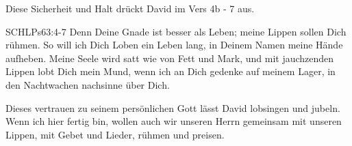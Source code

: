 \documentclass[14pt]{mybib}
\begin{document}
    \begin{otsblock}
        Diese Sicherheit und Halt drückt David im Vers 4b - 7 aus.
        \begin{bibelbox}{SCHL}{Ps}{63:4-7}
            Denn Deine Gnade ist besser als Leben; meine Lippen sollen Dich rühmen. So will ich Dich Loben ein Leben lang, in Deinem Namen meine Hände aufheben. Meine Seele wird satt wie von Fett und Mark, und mit jauchzenden Lippen lobt Dich mein Mund, wenn ich an Dich gedenke auf meinem Lager, in den Nachtwachen nachsinne über Dich.
        \end{bibelbox}
        Dieses vertrauen zu seinem persönlichen Gott lässt David lobsingen und jubeln.
        Wenn ich hier fertig bin, wollen auch wir unseren Herrn gemeinsam mit unseren Lippen, mit Gebet und Lieder, rühmen und preisen.
    \end{otsblock}    
\end{document}
